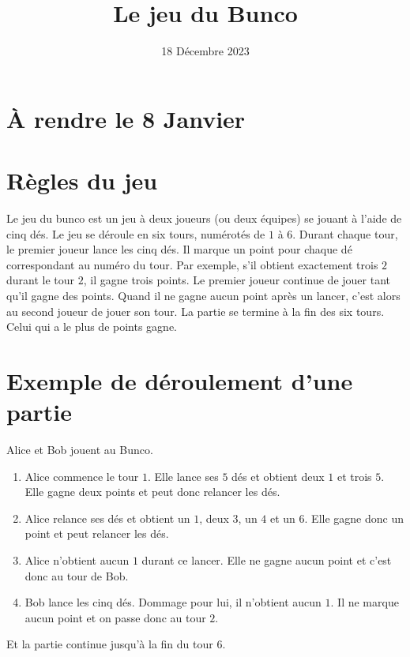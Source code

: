 \documentclass{article}
\title{Le jeu du Bunco}
\date{18 Décembre 2023}
\begin{document}
\maketitle
\section*{À rendre le 8 Janvier}
\section{Règles du jeu}
Le jeu du bunco est un jeu à deux joueurs (ou deux équipes) se jouant à l'aide de cinq dés. Le jeu se déroule en six tours, numérotés de $1$ à $6$. Durant chaque tour, le premier joueur lance les cinq dés. Il marque un point pour chaque dé correspondant au numéro du tour. Par exemple, s'il obtient exactement trois $2$ durant le tour $2$, il gagne trois points. Le premier joueur continue de jouer tant qu'il gagne des points. Quand il ne gagne aucun point après un lancer, c'est alors au second joueur de jouer son tour. La partie se termine à la fin des six tours. Celui qui a le plus de points gagne.
\section{Exemple de déroulement d'une partie}
Alice et Bob jouent au Bunco. 
\begin{enumerate}
    \item Alice commence le tour $1$. Elle lance ses $5$ dés et obtient deux $1$ et trois $5$. Elle gagne deux points et peut donc relancer les dés.
    \item Alice relance ses dés et obtient un $1$, deux $3$, un $4$ et un $6$. Elle gagne donc un point et peut relancer les dés.
    \item Alice n'obtient aucun $1$ durant ce lancer. Elle ne gagne aucun point et c'est donc au tour de Bob.
    \item Bob lance les cinq dés. Dommage pour lui, il n'obtient aucun $1$. Il ne marque aucun point et on passe donc au tour $2$.
\end{enumerate}
Et la partie continue jusqu'à la fin du tour $6$.
\end{document}
